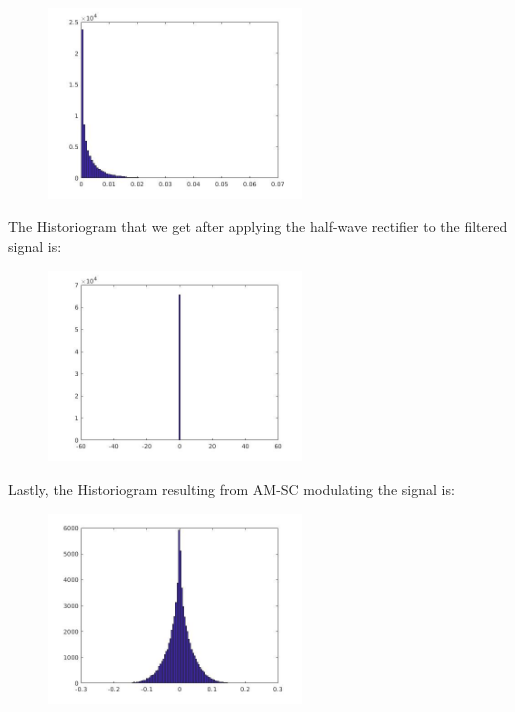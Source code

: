 \documentclass[a4paper,11pt]{article}
\begin{document}
\begin{figure}[!hp]
    \begin{center}
    \includegraphics[width=0.6\textwidth]{images/lab3_53.jpg}
    \end{center}
\end{figure}

\newpage

The Historiogram that we get after applying the half-wave rectifier to the filtered signal is:

\begin{figure}[!hp]
    \begin{center}
    \includegraphics[width=0.6\textwidth]{images/lab3_54.jpg}
    \end{center}
\end{figure}

Lastly, the Historiogram resulting from AM-SC modulating the signal is:

\begin{figure}[!hp]
    \begin{center}
    \includegraphics[width=0.6\textwidth]{images/lab3_55.jpg}
    \end{center}
\end{figure}
\end{document}
